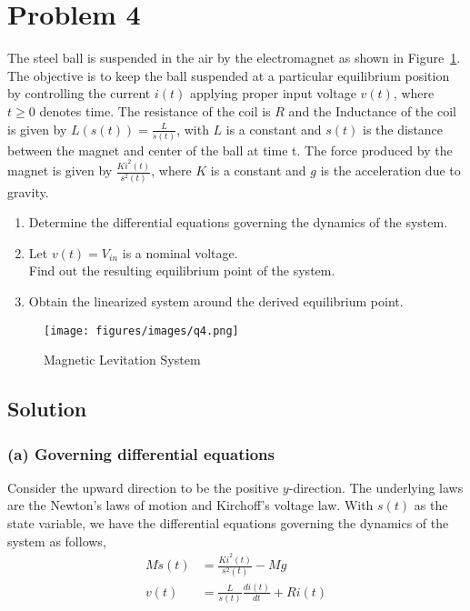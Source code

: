 \section*{Problem 4}

The steel ball is suspended in the air by the electromagnet as shown in Figure~\ref{fig:q4}.
The objective is to keep the ball suspended at a particular equilibrium position by controlling the current \(i(t)\) applying proper input voltage \(v(t)\), where \(t \geq 0\) denotes time.
The resistance of the coil is \(R\) and the Inductance of the coil is given by \(L(s(t)) = \frac{L}{s(t)}\), with \(L\) is a constant and \(s(t)\) is the distance between the magnet and center of the ball at time t.
The force produced by the magnet is given by \(\frac{K i^2(t)}{s^2(t)}\), where \(K\) is a constant and \(g\) is the acceleration due to gravity.

\begin{enumerate}[label= (\alph*)]
    \item Determine the differential equations governing the dynamics of the system.
    \item Let \(v(t) = V_{in}\) is a nominal voltage. \\
          Find out the resulting equilibrium point of the system.
    \item Obtain the linearized system around the derived equilibrium point.
\end{enumerate}

\begin{figure}[h]
    \centering
    \texttt{[image: figures/images/q4.png]}
    \caption{
        Magnetic Levitation System
    }\label{fig:q4}
\end{figure}

\subsection*{Solution}

\subsubsection*{(a) Governing differential equations}

Consider the upward direction to be the positive \(y\)-direction.
The underlying laws are the Newton's laws of motion and Kirchoff's voltage law.
With \(s(t)\) as the state variable, we have the differential equations governing the dynamics of the system as follows,
\begin{align*}
    M \ddot s(t) & = \frac{Ki^2(t)}{s^2(t)} - Mg             \\
    v(t)         & = \frac{L}{s(t)}\frac{di(t)}{dt} + R i(t)
\end{align*}

